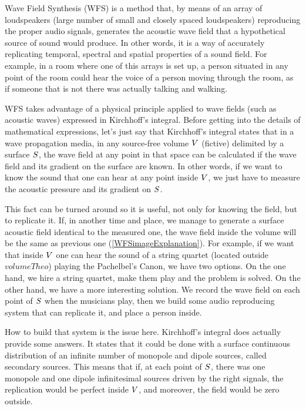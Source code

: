 Wave Field Synthesis (WFS) is a method that, by means of an array of loudspeakers (large number of small and closely spaced loudspeakers) reproducing the proper audio signals, generates the acoustic wave field that a hypothetical source of sound would produce. In other words, it is a way of accurately replicating temporal, spectral and spatial properties of a sound field. For example, in a room where one of this arrays is set up, a person situated in any point of the room could hear the voice of a person moving through the room, as if someone that is not there was actually talking and walking.

WFS takes advantage of a physical principle applied to wave fields (such as acoustic waves) expressed in Kirchhoff's integral. Before getting into the details of mathematical expressions, let's just say that Kirchhoff's integral states that in a wave propagation media, in any source-free volume $V$ (fictive) delimited by a surface $S$, the wave field at any point in that space can be calculated if the wave field and its gradient on the surface are known. In other words, if we want to know the sound that one can hear at any point inside $V$, we just have to measure the acoustic pressure and its gradient on $S$.

This fact can be turned around so it is useful, not only for knowing the field, but to replicate it.
If, in another time and place, we manage to generate a surface acoustic field identical to the measured one, the wave field inside the volume will be the same as previous one (\autoref{WFSimageExplanation}).
For example, if we want that inside $V$ one can hear the sound of a string quartet (located outside $volumeTheo$) playing the Pachelbel's Canon, we have two options. On the one hand, we hire a string quartet, make them play and the problem is solved. On the other hand, we have a more interesting solution. We record the wave field on each point of $S$ when the musicians play, then we build some audio reproducing system that can replicate it, and place a person inside.

How to build that system is the issue here. Kirchhoff's integral does actually provide some answers. It states that it could be done with a surface continuous distribution of an infinite number of monopole and dipole sources, called secondary sources. This means that if, at each point of $S$, there was one monopole and one dipole infinitesimal sources driven by the right signals, the replication would be perfect inside $V$, and moreover, the field would be zero outside.

